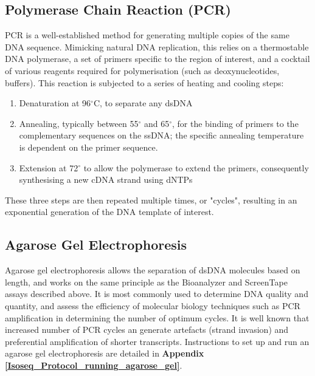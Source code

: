 \subsection{Polymerase Chain Reaction (PCR)}
\label{section:ch2_PCR_explanation} 
PCR is a well-established method for generating multiple copies of the same DNA sequence. Mimicking natural DNA replication, this relies on a thermostable DNA polymerase, a set of primers specific to the region of interest, and a cocktail of various reagents required for polymerisation (such as deoxynucleotides, buffers). This reaction is subjected to a series of heating and cooling steps: 
\begin{enumerate}
	\item Denaturation at 96$^{\circ}$C, to separate any dsDNA 
	\item Annealing, typically between 55$^{\circ}$  and 65$^{\circ}$, for the binding of primers to the complementary sequences on the ssDNA; the specific annealing temperature is dependent on the primer sequence. 
	\item Extension at 72$^{\circ}$ to allow the polymerase to extend the primers, consequently synthesising a new cDNA strand using dNTPs
\end{enumerate} 
These three steps are then repeated multiple times, or "cycles", resulting in an exponential generation of the DNA template of interest.

\subsection{Agarose Gel Electrophoresis}
\label{section:ch2_agarose_explanation}  
Agarose gel electrophoresis allows the separation of dsDNA molecules based on length, and works on the same principle as the Bioanalyzer and ScreenTape assays described above. It is most commonly used to determine DNA quality and quantity, and assess the efficiency of molecular biology techniques such as PCR amplification in determining the number of optimum cycles. It is well known that increased number of PCR cycles an generate artefacts (strand invasion) and preferential amplification of shorter transcripts\cite{Acinas2005,Bayega2018}. Instructions to set up and run an agarose gel electrophoresis are detailed in \textbf{Appendix \ref{Isoseq_Protocol_running_agarose_gel}}.


